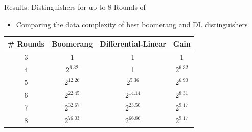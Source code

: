 \begin{frame}{Results: Distinguishers for up to 8 Rounds of }
\begin{itemize}
  \item Comparing the data complexity of best boomerang and DL distinguishers
\end{itemize}
\begin{center}
\begin{tabular}[t]{c|c|c|c}
\toprule
\# Rounds    &  Boomerang \cite{tosc_HadipourNE22} & Differential-Linear & Gain\\
\midrule
3            &  1            & 1           & 1\\
4            &  $2^{6.32}$   & 1           & $2^{6.32}$\\
5            &  $2^{12.26}$  & $2^{5.36}$  & $2^{6.90}$\\
6            &  $2^{22.45}$  & $2^{14.14}$ & $2^{8.31}$\\
7            &  $2^{32.67}$  & $2^{23.50}$ & $2^{9.17}$\\
8            &  $2^{76.03}$  & $2^{66.86}$ & $2^{9.17}$\\
\bottomrule
\end{tabular}
\end{center}
\end{frame}


